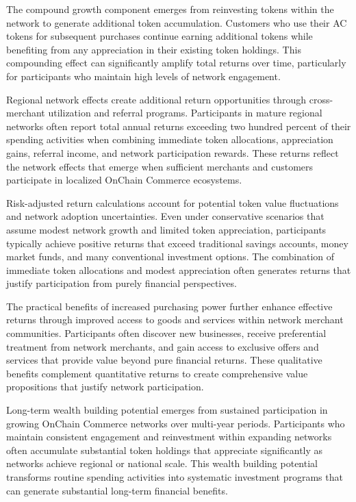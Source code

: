 \documentclass[
  Letterpaper,
]{scrbook}
\begin{document}
The compound growth component emerges from reinvesting tokens within the
network to generate additional token accumulation. Customers who use
their AC tokens for subsequent purchases continue earning additional
tokens while benefiting from any appreciation in their existing token
holdings. This compounding effect can significantly amplify total
returns over time, particularly for participants who maintain high
levels of network engagement.

Regional network effects create additional return opportunities through
cross-merchant utilization and referral programs. Participants in mature
regional networks often report total annual returns exceeding two
hundred percent of their spending activities when combining immediate
token allocations, appreciation gains, referral income, and network
participation rewards. These returns reflect the network effects that
emerge when sufficient merchants and customers participate in localized
OnChain Commerce ecosystems.

Risk-adjusted return calculations account for potential token value
fluctuations and network adoption uncertainties. Even under conservative
scenarios that assume modest network growth and limited token
appreciation, participants typically achieve positive returns that
exceed traditional savings accounts, money market funds, and many
conventional investment options. The combination of immediate token
allocations and modest appreciation often generates returns that justify
participation from purely financial perspectives.

The practical benefits of increased purchasing power further enhance
effective returns through improved access to goods and services within
network merchant communities. Participants often discover new
businesses, receive preferential treatment from network merchants, and
gain access to exclusive offers and services that provide value beyond
pure financial returns. These qualitative benefits complement
quantitative returns to create comprehensive value propositions that
justify network participation.

Long-term wealth building potential emerges from sustained participation
in growing OnChain Commerce networks over multi-year periods.
Participants who maintain consistent engagement and reinvestment within
expanding networks often accumulate substantial token holdings that
appreciate significantly as networks achieve regional or national scale.
This wealth building potential transforms routine spending activities
into systematic investment programs that can generate substantial
long-term financial benefits.
\end{document}

